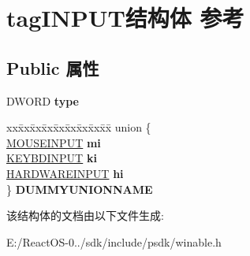\hypertarget{structtag_i_n_p_u_t}{}\section{tag\+I\+N\+P\+U\+T结构体 参考}
\label{structtag_i_n_p_u_t}
\subsection*{Public 属性}
\begin{DoxyCompactItemize}
\item 
\mbox{\label{structtag_i_n_p_u_t_a31c3bd8e2e5a29c3d9ec2628cc2910c7}} 
D\+W\+O\+RD {\bfseries type}
\item 
\mbox{\label{structtag_i_n_p_u_t_a68f65dd63c7eecf4a62388ad87f5f27a}} 
\begin{tabbing}
xx\=xx\=xx\=xx\=xx\=xx\=xx\=xx\=xx\=\kill
union \{\\
\>\hyperlink{structtag_m_o_u_s_e_i_n_p_u_t}{MOUSEINPUT} {\bfseries mi}\\
\>\hyperlink{structtag_k_e_y_b_d_i_n_p_u_t}{KEYBDINPUT} {\bfseries ki}\\
\>\hyperlink{structtag_h_a_r_d_w_a_r_e_i_n_p_u_t}{HARDWAREINPUT} {\bfseries hi}\\
\} {\bfseries DUMMYUNIONNAME}\\

\end{tabbing}\end{DoxyCompactItemize}


该结构体的文档由以下文件生成\+:\begin{DoxyCompactItemize}
\item 
E\+:/\+React\+O\+S-\/0../sdk/include/psdk/winable.\+h\end{DoxyCompactItemize}
